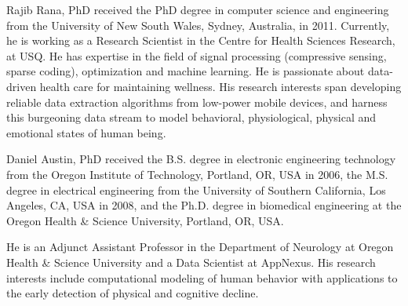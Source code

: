 \documentclass[journal]{IEEEtran}
\begin{document}
\ifCLASSOPTIONcaptionsoff
  \newpage
\fi



















\vspace{-1.2 cm}
\begin{IEEEbiography}
{Rajib Rana, PhD}
received the PhD degree in computer science and engineering from the University of New South Wales, Sydney, Australia, in 2011. Currently, he is working as a Research Scientist in the Centre for Health Sciences Research, at USQ. He has expertise in the field of  signal
processing (compressive sensing, sparse coding),  optimization and machine learning. He is passionate about data-driven health care for maintaining wellness. His research interests span developing reliable data extraction algorithms from low-power mobile devices, and harness this burgeoning data stream to model behavioral, physiological, physical and emotional states of human being.
\end{IEEEbiography}
\vspace{-1.4 cm}
\begin{IEEEbiography}
{Daniel Austin, PhD}
received the B.S. degree in electronic engineering technology from the Oregon Institute of Technology, Portland, OR, USA in 2006, the M.S. degree in electrical engineering from the University of Southern California, Los Angeles, CA, USA in 2008, and the Ph.D. degree in biomedical engineering at the Oregon Health \& Science University, Portland, OR, USA.
	
He is an Adjunct Assistant Professor in the Department of Neurology at Oregon Health \& Science University and a Data Scientist at AppNexus.  His research interests include computational modeling of human behavior with applications to the early detection of physical and cognitive decline.
\end{IEEEbiography}
\vspace{-1.4 cm}
\end{document}
